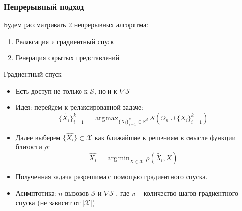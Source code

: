 \documentclass[10pt]{beamer}
\DeclareMathOperator*{\argmax}{\arg\!\max}
\DeclareMathOperator*{\argmin}{\arg\!\min}
\begin{document}
\begin{frame}
	\frametitle{Непрерывный подход}
		Будем рассматривать 2 непрерывных алгоритма:
		\begin{enumerate}	
			\item Релаксация и градиентный спуск
			\item Генерация скрытых представлений
		\end{enumerate}
		
		\begin{block}{Градиентный спуск}
			\begin{itemize}
				\item Есть доступ не только к $\mathcal{S}$, но и к $\nabla\mathcal{S}$ 
				\item Идея: перейдем к релаксированной задаче:
				 	$$\{\tilde{X_i}\}_{i=1}^k= \argmax_{\{X_i\}_{i=1}^k\subset\mathbb{R}^d} \mathcal{S}\left(O_n\cup\{X_i\}_{i=1}^k\right)$$
		 \item Далее выберем $\{\hat{X_i}\}\subset\mathcal{X}$ как ближайшие к решениям  в смысле функции близости $\rho$:
		 \vspace{-0.3cm}
		 $$\hat{X_i} =  \argmin_{X\in\mathcal{X}} \rho(\tilde{X_i}, X)$$
		  \vspace{-0.5cm}
		 \item Полученная задача разрешима с помощью градиентного спуска.
		 \item Асимптотика: $n$ вызовов $\mathcal{S}$ и $\nabla\mathcal{S}$ , где $n$ -- количество шагов градиентного спуска (не зависит от $|\mathcal{X}|$)
			\end{itemize}
		\end{block}
\end{frame}
\end{document}
